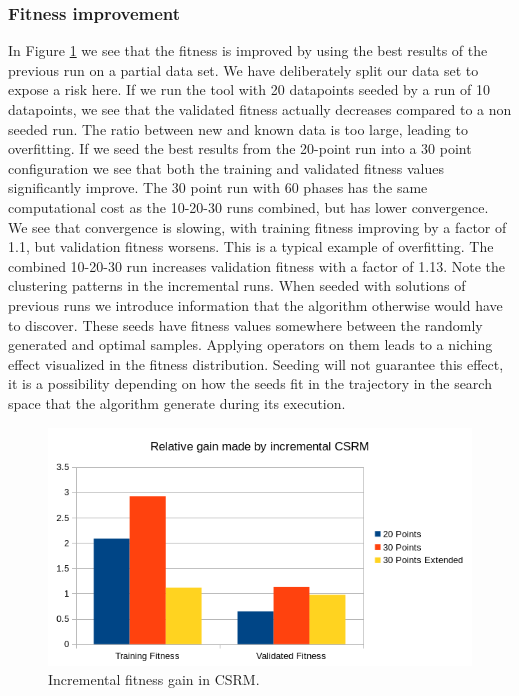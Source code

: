 \subsubsection{Fitness improvement}
In Figure \ref{fig:incrementalgain} we see that the fitness is improved by using the best results of the previous run on a partial data set. We have deliberately split our data set to expose a risk here. If we run the tool with 20 datapoints seeded by a run of 10 datapoints, we see that the validated fitness actually decreases compared to a non seeded run. The ratio between new and known data is too large, leading to overfitting. If we seed the best results from the 20-point run into a 30 point configuration we see that both the training and validated fitness values significantly improve. 
The 30 point run with 60 phases has the same computational cost as the 10-20-30 runs combined, but has lower convergence. We see that convergence is slowing, with training fitness improving by a factor of 1.1, but validation fitness worsens. This is a typical example of overfitting. The combined 10-20-30 run increases validation fitness with a factor of 1.13. Note the clustering patterns in the incremental runs. When seeded with solutions of previous runs we introduce information that the algorithm otherwise would have to discover. These seeds have fitness values somewhere between the randomly generated and optimal samples. Applying operators on them leads to a niching effect visualized in the fitness distribution. Seeding will not guarantee this effect, it is a possibility depending on how the seeds fit in the trajectory in the search space that the algorithm generate during its execution.
\begin{figure}
    \centering
    \includegraphics[width=\textwidth,height=\textheight,keepaspectratio]{figures/incrementalgain.png}
    \caption{Incremental fitness gain in CSRM.}
    \label{fig:incrementalgain}
\end{figure}
